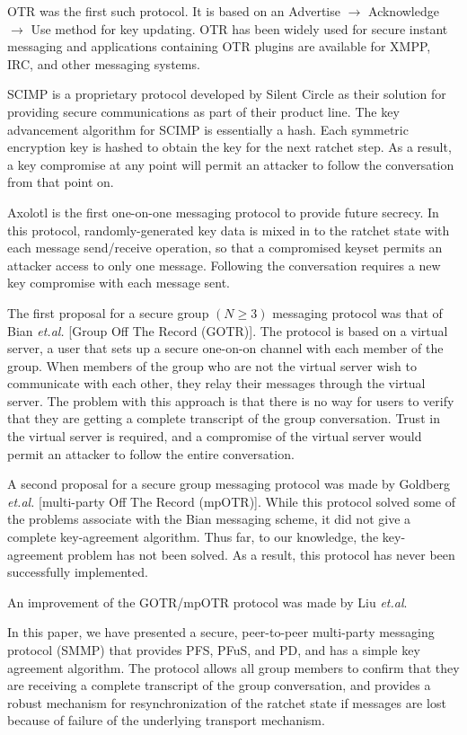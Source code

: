 \documentclass[%
preprint,
amsmath,amssymb,
aps,
prb,
floatfix,
]{revtex4-1}
\begin{document}
OTR was the first such protocol. It is based on an Advertise $\rightarrow$
Acknowledge $\rightarrow$ Use method for key updating. OTR has been widely used
for secure instant messaging and applications containing OTR plugins are
available for XMPP, IRC, and other messaging systems.

SCIMP is a proprietary protocol developed by Silent Circle as their solution for
providing secure communications as part of their product line. The key
advancement algorithm for SCIMP is essentially a hash. Each symmetric encryption
key is hashed to obtain the key for the next ratchet step. As a result, a key
compromise at any point will permit an attacker to follow the conversation from
that point on.

Axolotl is the first one-on-one messaging protocol to provide future secrecy. In
this protocol, randomly-generated key data is mixed in to the ratchet state with
each message send/receive operation, so that a compromised keyset permits an
attacker access to only one message. Following the conversation requires a new
key compromise with each message sent.

The first proposal for a secure group $(N \ge 3)$ messaging protocol was that of
Bian \textit{et.al.}\cite{ref:bian} [Group Off The Record (GOTR)]. The protocol is based on a virtual server,
a user that sets up a secure one-on-on channel with each member of the group.
When members of the group who are not the virtual server wish to communicate
with each other, they relay their messages through the virtual server. The
problem with this approach is that there is no way for users to verify that they
are getting a complete transcript of the group conversation. Trust in the
virtual server is required, and a compromise of the virtual server would permit
an attacker to follow the entire conversation.

A second proposal for a secure group messaging protocol was made by Goldberg
\textit{et.al.}\cite{ref:goldberg} [multi-party Off The Record (mpOTR)].
While this protocol solved some of the
problems associate with the Bian messaging scheme, it did not give a complete
key-agreement algorithm. Thus far, to our knowledge, the key-agreement problem
has not been solved. As a result, this protocol has never been successfully
implemented.

An improvement of the GOTR/mpOTR protocol was made by Liu
\textit{et.al}\cite{ref:liu}.

In this paper, we have presented a secure, peer-to-peer multi-party messaging protocol
(SMMP) that provides PFS, PFuS, and PD, and has a simple key agreement
algorithm. The protocol allows all group members to confirm that they are
receiving a complete transcript of the group conversation, and provides a
robust mechanism for resynchronization of the ratchet state if messages are lost
because of failure of the underlying transport mechanism.
\end{document}
